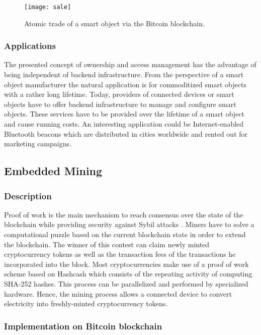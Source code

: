 \documentclass[10pt, conference,compsoc]{IEEEtran}
\begin{document}
  \begin{figure}[!t]
    \centering
    \texttt{[image: sale]}
    \caption{Atomic trade of a smart object via the Bitcoin blockchain.}
    \label{fig:sale}
  \end{figure}


\subsubsection{Applications}

The presented concept of ownership and access management has the advantage of being independent of backend infrastructure. From the perspective of a smart object manufacturer 
the natural application is for commoditized smart objects with a rather long lifetime. Today, providers of connected devices or smart objects have to offer backend infrastructure to manage and configure smart objects. These services have to be provided over the lifetime of a smart object and cause running costs. An interesting application could be Internet-enabled Bluetooth beacons which are distributed in cities worldwide and rented out for marketing campaigns. 


\subsection{Embedded Mining}

\subsubsection{Description}
Proof of work is the main mechanism to reach consensus over the state of the blockchain while providing security against Sybil attacks \cite{douceur2002sybil}. Miners have to solve a computational puzzle based on the current blockchain state in order to extend the blockchain. The winner of this contest can claim newly minted cryptocurrency tokens as well as the transaction fees of the transactions he incorporated into the block. Most cryptocurrencies make use of a proof of work scheme based on Hashcash \cite{back2002hashcash} which consists of the repeating activity of computing SHA-252 hashes. This process can be parallelized and performed by specialized hardware. Hence, the mining process allows a connected device to convert electricity into freshly-minted cryptocurrency tokens.

\subsubsection{Implementation on Bitcoin blockchain}
\end{document}

